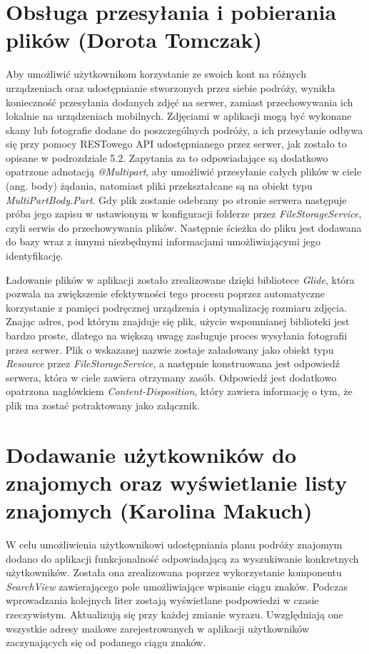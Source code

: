 \section{Obsługa przesyłania i pobierania plików (Dorota Tomczak)}
\par Aby umożliwić użytkownikom korzystanie ze swoich kont na różnych urządzeniach oraz udostępnianie stworzonych przez siebie podróży, wynikła konieczność przesyłania dodanych zdjęć na serwer, zamiast przechowywania ich lokalnie na urządzeniach mobilnych. Zdjęciami w aplikacji mogą być wykonane skany lub fotografie dodane do poszczególnych podróży, a ich przesyłanie odbywa się przy pomocy RESTowego API udostępnianego przez serwer, jak zostało to opisane w podrozdziale 5.2. Zapytania za to odpowiadające są dodatkowo opatrzone adnotacją \textit{@Multipart}, aby umożliwić przesyłanie całych plików w ciele (ang. body) żądania, natomiast pliki przekształcane są na obiekt typu \textit{MultiPartBody.Part}. Gdy plik zostanie odebrany po stronie serwera następuje próba jego zapisu w ustawionym w konfiguracji folderze przez \textit{FileStorageService}, czyli serwis do przechowywania plików. Następnie ścieżka do pliku jest dodawana do bazy wraz z innymi niezbędnymi informacjami umożliwiającymi jego identyfikację.

\par Ładowanie plików w aplikacji zostało zrealizowane dzięki bibliotece \textit{Glide}\cite{Glide}, która pozwala na zwiększenie efektywności tego procesu poprzez automatyczne korzystanie z pamięci podręcznej urządzenia i optymalizację rozmiaru zdjęcia. Znając adres, pod którym znajduje się plik, użycie wspomnianej biblioteki jest bardzo proste, dlatego na większą uwagę zasługuje proces wysyłania fotografii przez serwer. Plik o wskazanej nazwie zostaje załadowany jako obiekt typu \textit{Resource} przez \textit{FileStorageService}, a następnie konstruowana jest odpowiedź serwera, która w ciele zawiera otrzymany zasób. Odpowiedź jest dodatkowo opatrzona nagłówkiem \textit{Content-Disposition}, który zawiera informację o tym, że plik ma zostać potraktowany jako załącznik. 

\section{Dodawanie użytkowników do znajomych oraz wyświetlanie listy znajomych (Karolina Makuch)}

\par W celu umożliwienia użytkownikowi udostępniania planu podróży znajomym dodano do aplikacji funkcjonalność odpowiadającą za wyszukiwanie konkretnych użytkowników. Została ona zrealizowana poprzez  wykorzystanie komponentu \textit{SearchView} \cite{SearchView} zawierającego pole umożliwiające wpisanie ciągu znaków. Podczas wprowadzania kolejnych liter zostają wyświetlane podpowiedzi w czasie rzeczywistym. Aktualizują się  przy każdej zmianie wyrazu. Uwzględniają one wszystkie adresy mailowe zarejestrowanych w aplikacji użytkowników zaczynających się od podanego ciągu znaków.

